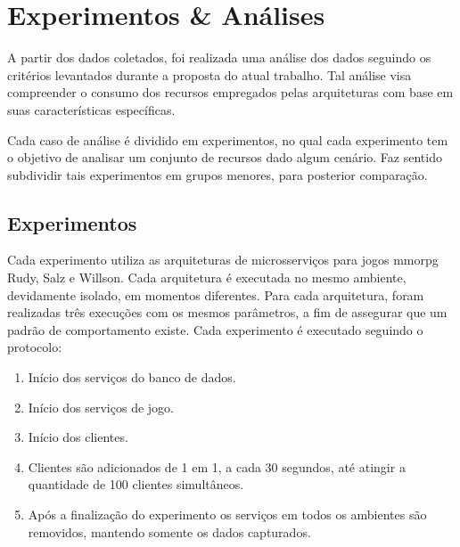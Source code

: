 \chapter{Experimentos \& Análises}
\label{cap6}



A partir dos dados coletados, foi realizada uma análise dos dados seguindo os critérios levantados durante a proposta do atual trabalho.
%
Tal análise visa compreender o consumo dos recursos empregados pelas arquiteturas com base em suas características específicas.



Cada caso de análise é dividido em experimentos, no qual cada experimento tem o objetivo de analisar um conjunto de recursos dado algum cenário.
%
Faz sentido subdividir tais experimentos em grupos menores, para posterior comparação.





\section{Experimentos}
\label{sec:experimentos}

Cada experimento utiliza as arquiteturas de microsserviços para jogos \ac{mmorpg} Rudy, Salz e Willson.
%
Cada arquitetura é executada no mesmo ambiente, devidamente isolado, em momentos diferentes.
%
Para cada arquitetura, foram realizadas três execuções com os mesmos parâmetros, a fim de assegurar que um padrão de comportamento existe.
%
Cada  experimento é executado seguindo o protocolo:


\begin{enumerate}
 \item Início dos serviços do banco de dados.
 \item Início dos serviços de jogo.
 \item Início dos clientes.
 \item Clientes são adicionados de 1 em 1, a cada 30 segundos, até atingir a quantidade de 100 clientes simultâneos.
 \item Após a finalização do experimento os serviços em todos os ambientes são removidos, mantendo somente os dados capturados.
\end{enumerate}


